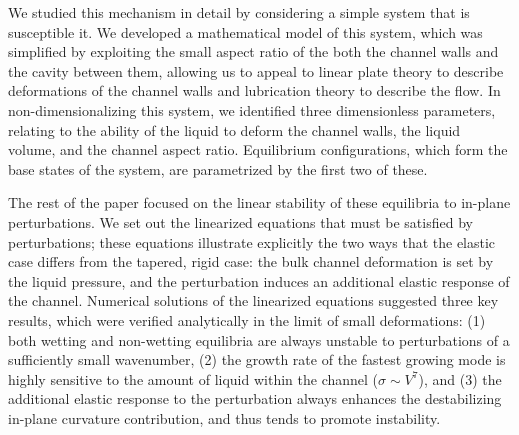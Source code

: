 \documentclass{jfm}
\begin{document}
We studied this mechanism in detail by considering a simple system that is susceptible it. We developed a mathematical model of this system, which was simplified by exploiting the small aspect ratio of the both the channel walls and the cavity between them, allowing us to appeal to linear plate theory to describe deformations of the channel walls and lubrication theory to describe the flow. In non-dimensionalizing this system, we identified three dimensionless parameters, relating to the ability of the liquid to deform the channel walls, the liquid volume, and the channel aspect ratio. Equilibrium configurations, which form the base states of the system, are parametrized by the first two of these. 

The rest of the paper focused on the linear stability of these equilibria to in-plane perturbations. We set out the linearized equations that must be satisfied by perturbations; these equations illustrate explicitly the two ways that the elastic case differs from the tapered, rigid case: the bulk channel deformation is set by the liquid pressure, and the perturbation induces an additional elastic response of the channel. Numerical solutions of the linearized equations suggested three key results, which were verified analytically in the limit of small deformations: (1) both wetting and non-wetting equilibria are always unstable to perturbations of a sufficiently small wavenumber, (2) the growth rate of the fastest growing mode is highly sensitive to the amount of liquid within the channel ($\sigma \sim V^7$), and (3) the additional elastic response to the perturbation always enhances the destabilizing in-plane curvature contribution, and thus tends to promote instability.

\end{document}
